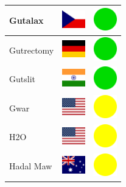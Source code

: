 \documentclass[12pt, a4paper, twoside]{report}
\begin{document}
\begin{center}
\begin{longtable}{|p{5cm}|p{2cm}|p{2cm}|}
 Gutalax                                                    & \includegraphics[width=1cm]{4x3/cz} &   \includegraphics[width=1cm]{likes/y} \\ \hline
 Gutrectomy                                                 & \includegraphics[width=1cm]{4x3/de} &   \includegraphics[width=1cm]{likes/y} \\ \hline
 Gutslit                                                    & \includegraphics[width=1cm]{4x3/in} &   \includegraphics[width=1cm]{likes/y} \\ \hline
 Gwar                                                       & \includegraphics[width=1cm]{4x3/us} &   \includegraphics[width=1cm]{likes/m} \\ \hline
 H2O                                                        & \includegraphics[width=1cm]{4x3/us} &   \includegraphics[width=1cm]{likes/m} \\ \hline
 Hadal Maw                                                  & \includegraphics[width=1cm]{4x3/au} &   \includegraphics[width=1cm]{likes/m} \\ \hline

\end{longtable}
\end{center}
\end{document}
